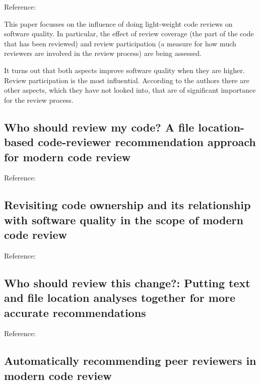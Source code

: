 \documentclass[]{book}
\begin{document}
Reference: \citet{mcintosh2014impact}

This paper focusses on the influence of doing light-weight code reviews
on software quality. In particular, the effect of review coverage (the
part of the code that has been reviewed) and review participation (a
measure for how much reviewers are involved in the review process) are
being assessed.

It turns out that both aspects improve software quality when they are
higher. Review participation is the most influential. According to the
authors there are other aspects, which they have not looked into, that
are of significant importance for the review process.

\subsection{Who should review my code? A file location-based
code-reviewer recommendation approach for modern code
review}\label{who-should-review-my-code-a-file-location-based-code-reviewer-recommendation-approach-for-modern-code-review}

Reference: \citet{thongtanunam2015should}

\subsection{Revisiting code ownership and its relationship with software
quality in the scope of modern code
review}\label{revisiting-code-ownership-and-its-relationship-with-software-quality-in-the-scope-of-modern-code-review}

Reference: \citet{thongtanunam2016revisiting}

\subsection{Who should review this change?: Putting text and file
location analyses together for more accurate
recommendations}\label{who-should-review-this-change-putting-text-and-file-location-analyses-together-for-more-accurate-recommendations}

Reference: \citet{xia2015should}

\subsection{Automatically recommending peer reviewers in modern code
review}\label{automatically-recommending-peer-reviewers-in-modern-code-review}
\end{document}
